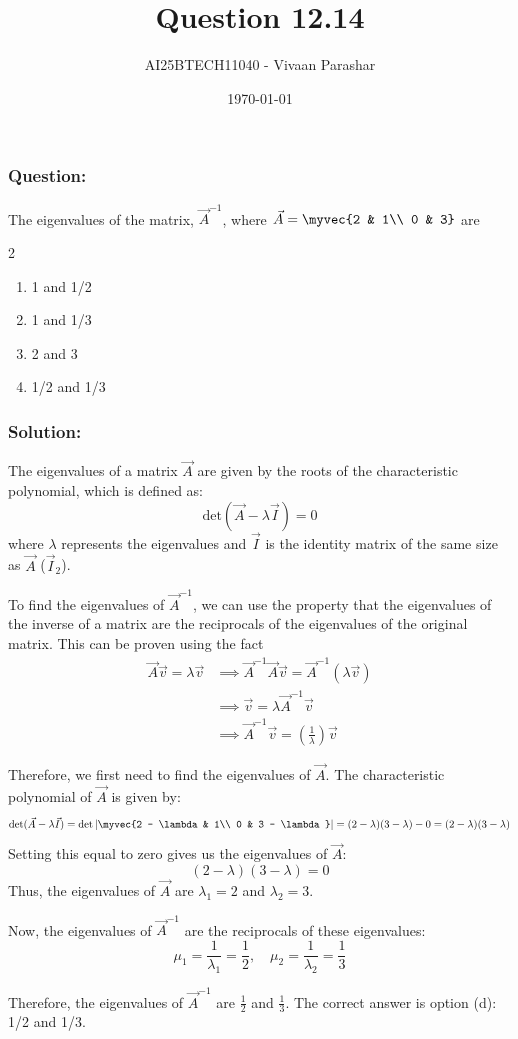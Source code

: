 \documentclass{beamer}
\title{Question 12.14}
\author{AI25BTECH11040 - Vivaan Parashar}
\date{\today}
\begin{document}
\frame{\titlepage}

\begin{frame}
    \frametitle{Question: }
    The eigenvalues of the matrix, $\vec{A}^{-1}$, where $\vec{A} = \myvec{2 & 1\\ 0 & 3}$ are
    \begin{multicols}{2}
        \begin{enumerate}[label=\alph*)]
            \item 1 and 1/2
            \item 1 and 1/3
            \item 2 and 3
            \item 1/2 and 1/3
        \end{enumerate}
    \end{multicols}
\end{frame}

\begin{frame}
    \frametitle{Solution: }
    The eigenvalues of a matrix $\vec{A}$ are given by the roots of the characteristic polynomial, which is defined as:
    \[\text{det}(\vec{A} - \lambda \vec{I}) = 0\]
    where $\lambda$ represents the eigenvalues and $\vec{I}$ is the identity matrix of the same size as $\vec{A}$ ($\vec{I}_2$).

    To find the eigenvalues of $\vec{A}^{-1}$, we can use the property that the eigenvalues of the inverse of a matrix are the reciprocals of the eigenvalues of the original matrix.
    This can be proven using the fact
    \begin{align*}
        \vec{A}\vec{v} = \lambda \vec{v} & \implies \vec{A}^{-1}\vec{A}\vec{v} = \vec{A}^{-1}(\lambda \vec{v})   \\
                                         & \implies \vec{v} = \lambda \vec{A}^{-1}\vec{v}                        \\
                                         & \implies \vec{A}^{-1}\vec{v} = \left(\frac{1}{\lambda}\right) \vec{v}
    \end{align*}
\end{frame}
\begin{frame}
    Therefore, we first need to find the eigenvalues of $\vec{A}$.
    The characteristic polynomial of $\vec{A}$ is given by:
    \[\text{det}(\vec{A} - \lambda \vec{I}) = \text{det}\left|\myvec{2 - \lambda & 1\\ 0 & 3 - \lambda}\right| = (2 - \lambda)(3 - \lambda) - 0 = (2 - \lambda)(3 - \lambda)\]
    Setting this equal to zero gives us the eigenvalues of $\vec{A}$:
    \[(2 - \lambda)(3 - \lambda) = 0\]
    Thus, the eigenvalues of $\vec{A}$ are $\lambda_1 = 2$ and $\lambda_2 = 3$.

    Now, the eigenvalues of $\vec{A}^{-1}$ are the reciprocals of these eigenvalues:
    \[\mu_1 = \frac{1}{\lambda_1} = \frac{1}{2}, \quad \mu_2 = \frac{1}{\lambda_2} = \frac{1}{3}\]

    Therefore, the eigenvalues of $\vec{A}^{-1}$ are $\frac{1}{2}$ and $\frac{1}{3}$.
    The correct answer is option (d): 1/2 and 1/3.
\end{frame}
\end{document}
